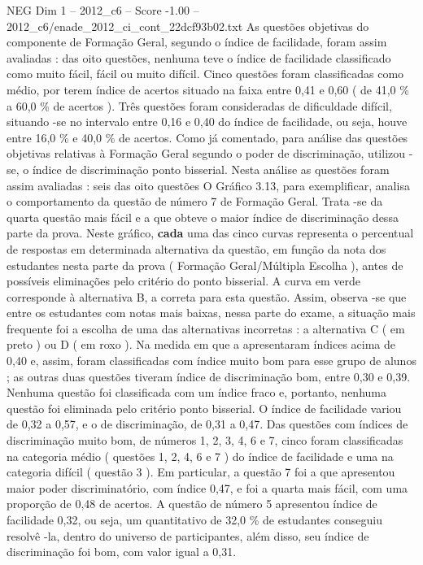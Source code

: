 \begin{textsample}{NEG Dim 1 – 2012\_c6 – Score -1.00 – 2012\_c6/enade\_2012\_ci\_cont\_22dcf93b02.txt}
As questões objetivas do componente de Formação Geral, segundo o índice de facilidade, foram assim avaliadas : das oito questões, nenhuma teve o índice de facilidade classificado como muito fácil, fácil ou muito difícil.
Cinco questões foram classificadas como médio, por terem índice de acertos situado na faixa entre 0,41 e 0,60 ( de 41,0 \% a 60,0 \% de acertos ).
Três questões foram consideradas de dificuldade difícil, situando -se no intervalo entre 0,16 e 0,40 do índice de facilidade, ou seja, houve entre 16,0 \% e 40,0 \% de acertos.
Como já comentado, para análise das questões objetivas relativas à Formação Geral segundo o poder de discriminação, utilizou -se, o índice de discriminação ponto bisserial.
Nesta análise as questões foram assim avaliadas : seis das oito questões O Gráfico 3.13, para exemplificar, analisa o comportamento da questão de número 7 de Formação Geral.
Trata -se da quarta questão mais fácil e a que obteve o maior índice de discriminação dessa parte da prova.
Neste gráfico, \textbf{cada} uma das cinco curvas representa o percentual de respostas em determinada alternativa da questão, em função da nota dos estudantes nesta parte da prova ( Formação Geral/Múltipla Escolha ), antes de possíveis eliminações pelo critério do ponto bisserial.
A curva em verde corresponde à alternativa B, a correta para esta questão.
Assim, observa -se que entre os estudantes com notas mais baixas, nessa parte do exame, a situação mais frequente foi a escolha de uma das alternativas incorretas : a alternativa C ( em preto ) ou D ( em roxo ).
Na medida em que a apresentaram índices acima de 0,40 e, assim, foram classificadas com índice muito bom para esse grupo de alunos ; as outras duas questões tiveram índice de discriminação bom, entre 0,30 e 0,39.
Nenhuma questão foi classificada com um índice fraco e, portanto, nenhuma questão foi eliminada pelo critério ponto bisserial.
O índice de facilidade variou de 0,32 a 0,57, e o de discriminação, de 0,31 a 0,47.
Das questões com índices de discriminação muito bom, de números 1, 2, 3, 4, 6 e 7, cinco foram classificadas na categoria médio ( questões 1, 2, 4, 6 e 7 ) do índice de facilidade e uma na categoria difícil ( questão 3 ).
Em particular, a questão 7 foi a que apresentou maior poder discriminatório, com índice 0,47, e foi a quarta mais fácil, com uma proporção de 0,48 de acertos.
A questão de número 5 apresentou índice de facilidade 0,32, ou seja, um quantitativo de 32,0 \% de estudantes conseguiu resolvê -la, dentro do universo de participantes, além disso, seu índice de discriminação foi bom, com valor igual a 0,31.

\end{textsample}
